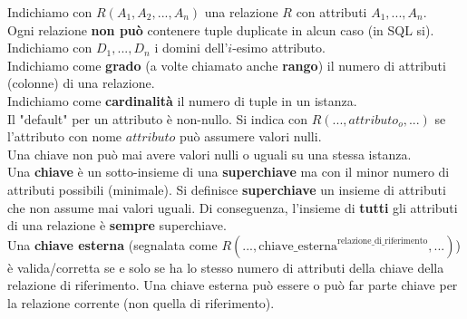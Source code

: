 Indichiamo con $R(A_1, A_2, ..., A_n)$ una relazione $R$ con attributi $A_1, ..., A_n$.\\
Ogni relazione \textbf{non può} contenere tuple duplicate in alcun caso (in SQL si). \vspace{2mm} \\
Indichiamo con $D_1, ..., D_n$ i domini dell'$i$-esimo attributo.\\
Indichiamo come \textbf{grado} (a volte chiamato anche \textbf{rango}) il numero di attributi (colonne) di una relazione.\\
Indichiamo come \textbf{cardinalità} il numero di tuple in un istanza. \vspace{2mm} \\
Il "default" per un attributo \`e non-nullo. Si indica con $R(..., attributo_o, ...)$ se l'attributo con nome $attributo$ può assumere valori nulli. \vspace{2mm} \\
Una chiave non può mai avere valori nulli o uguali su una stessa istanza.\\
Una \textbf{chiave} \`e un sotto-insieme di una \textbf{superchiave} ma con il minor numero di attributi possibili (minimale). Si definisce \textbf{superchiave} un insieme di attributi che non assume mai valori uguali. Di conseguenza, l'insieme di \textbf{tutti} gli attributi di una relazione \`e \textbf{sempre} superchiave. \vspace{2mm} \\
Una \textbf{chiave esterna} (segnalata come $R(..., \text{chiave\_esterna}^{\text{relazione\_di\_riferimento}}, ...)$) \`e valida/corretta se e solo se ha lo stesso numero di attributi della chiave della relazione di riferimento. Una chiave esterna può essere o può far parte chiave per la relazione corrente (non quella di riferimento).
